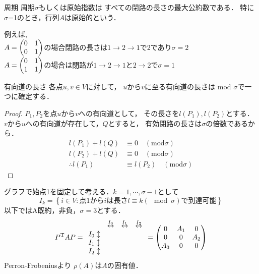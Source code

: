 \begin{itembox}[l]{周期}
  周期$\sigma$もしくは原始指数は
  すべての閉路の長さの最大公約数である．
  特に$\sigma$=1のとき，行列$A$は原始的という．
\end{itembox}
例えば,\\
$A=\begin{pmatrix} 0 & 1 \\ 0 & 1 \end{pmatrix}$の場合閉路の長さは$1\to 2\to 1$で2であり$\sigma =2$\\
$A=\begin{pmatrix} 0 & 1 \\ 1 & 1 \end{pmatrix}$の場合は閉路が$1\to 2\to 1と2\to 2$で$\sigma =1$
\\
\begin{itembox}[l]{有向道の長さ}
  各点$u,v　\in V$に対して，
  $u$から$v$に至る有向道の長さは
  mod $\sigma$で一つに確定する．
\end{itembox}
\begin{proof}
$P_1,P_2$を点$u$から$v$への有向道として，
その長さを$l(P_1),l(P_2)$とする．
$v$から$u$への有向道が存在して，$Q$とすると，
有効閉路の長さは$\sigma$の倍数であるから．
\begin{align}
    l(P_1) + l(Q) &\equiv 0 \quad (\mathrm{mod} \sigma)\\
     l(P_2) + l(Q) &\equiv 0 \quad (\mathrm{mod} \sigma)\\
     \therefore l(P_1) &\equiv l(P_2) \quad (\mathrm{mod} \sigma)
\end{align}
\end{proof}
グラフで始点1を固定して考える．$k=1,\cdots,\sigma - 1$として
\begin{equation}
    I_k = \left\{ i\in V: \text{点1から$i$は長さ$l$}\equiv k(\mod\sigma)
    \text{で到達可能}\right\}
\end{equation}
以下ではA既約，非負，$\sigma =3$とする．
\begin{equation}
  {P}^{\mathrm{T}}AP=
  \begin{array}{rccc}
    &\overset{I_0}{\leftrightarrow}&\overset{I_1}{\leftrightarrow}&\overset{I_2}{\leftrightarrow}\\
    I_0 \updownarrow&&&\\
    I_1 \updownarrow&&&\\
    I_2 \updownarrow&&&\\
  \end{array}=
  \begin{pmatrix}
    0&A_1 &0\\
    0&0&A_2\\
    A_3 &0&0
  \end{pmatrix}
\end{equation}
Perron-Frobeniusより
$\rho(A)$は$A$の固有値．\\
